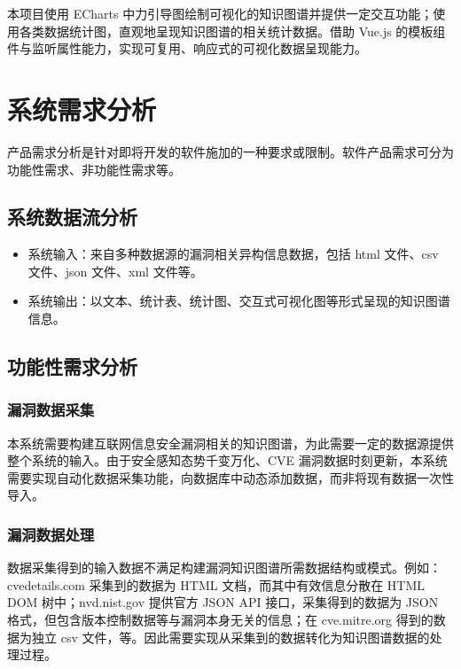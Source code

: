\documentclass[a4paper,AutoFakeBold,oneside,12pt]{book}
\begin{document}
本项目使用 ECharts 中力引导图绘制可视化的知识图谱并提供一定交互功能；使用各类数据统计图，直观地呈现知识图谱的相关统计数据。借助 Vue.js 的模板组件与监听属性能力，实现可复用、响应式的可视化数据呈现能力。

\chapter{系统需求分析}

产品需求分析是针对即将开发的软件施加的一种要求或限制。软件产品需求可分为功能性需求、非功能性需求等。\cite{bourque_guide_2014}

\section{系统数据流分析}

\begin{itemize}
	\item 系统输入：来自多种数据源的漏洞相关异构信息数据，包括 html 文件、csv 文件、json 文件、xml 文件等。
	\item 系统输出：以文本、统计表、统计图、交互式可视化图等形式呈现的知识图谱信息。
\end{itemize}

\section{功能性需求分析}

\subsection{漏洞数据采集}

本系统需要构建互联网信息安全漏洞相关的知识图谱，为此需要一定的数据源提供整个系统的输入。由于安全感知态势千变万化、CVE 漏洞数据时刻更新，本系统需要实现自动化数据采集功能，向数据库中动态添加数据，而非将现有数据一次性导入。

\subsection{漏洞数据处理}

数据采集得到的输入数据不满足构建漏洞知识图谱所需数据结构或模式。例如：cvedetails.com 采集到的数据为 HTML 文档，而其中有效信息分散在 HTML DOM 树中；nvd.nist.gov 提供官方 JSON API 接口，采集得到的数据为 JSON 格式，但包含版本控制数据等与漏洞本身无关的信息；在 cve.mitre.org 得到的数据为独立 csv 文件，等。因此需要实现从采集到的数据转化为知识图谱数据的处理过程。
\end{document}
